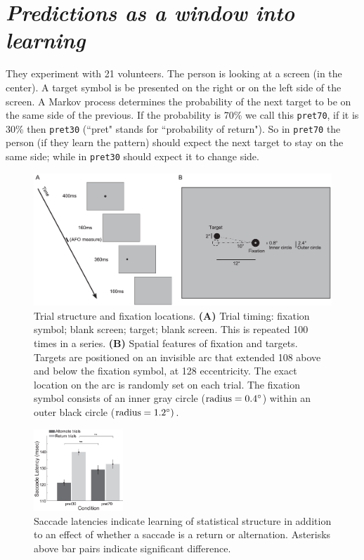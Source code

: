 \section[Predictions as a window into learning]{\textit{Predictions as a window into learning}\\ }
They experiment with 21 volunteers. The person is looking at a screen (in the center). A target symbol is be presented on the right or on the left side of the screen. A Markov process determines the probability of the next target to be on the same side of the previous. If the probability is 70\% we call this \texttt{pret70}, if it is 30\% then \texttt{pret30} (``pret" stands for ``probability of return"). So in \texttt{pret70} the person (if they learn the pattern) should expect the next target to stay on the same side; while in \texttt{pret30} should expect it to change side.

\begin{figure}[!ht]
    \centering
    \captionsetup{width=.8\linewidth}
    \includegraphics[width=0.7\linewidth]{images/notaro.png}
    \caption{Trial structure and fixation locations. \textbf{(A)} Trial timing: fixation symbol; blank screen; target; blank screen. This is repeated 100 times in a series. \textbf{(B)} Spatial features of fixation and targets. Targets are positioned on an invisible arc that extended 108 above and below the fixation symbol, at 128 eccentricity. The exact location on the arc is randomly set on each trial. The fixation symbol consists of an inner gray circle ($\text{radius} = 0.4\degree$) within an outer black circle ($\text{radius} = 1.2\degree)$.}
    \label{fig:notaro}
\end{figure}

\begin{figure}
  \centering
  \includegraphics[width=0.3\textwidth]{images/saccade.png}
  \caption{Saccade latencies indicate learning of statistical structure in addition to an effect of whether a saccade is a return or alternation. Asterisks above bar pairs indicate significant difference.}
  \label{fig:saccade}
\end{figure}

